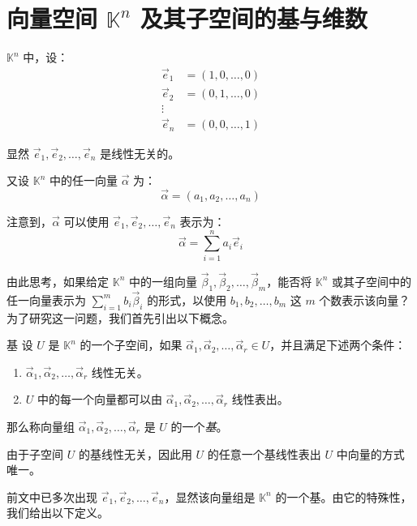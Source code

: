 
\section{向量空间 $\mathbb K^n$ 及其子空间的基与维数}

$\mathbb K^n$ 中，设：
$$
\begin{aligned}
	\vec e_1 &= (1, 0, \ldots, 0)
	\\
	\vec e_2 &= (0, 1, \ldots, 0)
	\\
	\vdots
	\\
	\vec e_n &= (0, 0, \ldots, 1)
\end{aligned}
$$

显然 $\vec e_1, \vec e_2, \ldots, \vec e_n$ 是线性无关的。

又设 $\mathbb K^n$ 中的任一向量 $\vec \alpha$ 为：
$$
\vec \alpha = (a_1, a_2, \ldots, a_n)
$$

注意到，$\vec \alpha$ 可以使用 $\vec e_1, \vec e_2, \ldots, \vec e_n$ 表示为：
$$
\vec \alpha = \sum\limits_{i = 1}^n a_i \vec e_i
$$

由此思考，如果给定 $\mathbb K^n$ 中的一组向量 $\vec \beta_1, \vec \beta_2, \ldots, \vec \beta_m$，能否将 $\mathbb K^n$ 或其子空间中的任一向量表示为 $\sum\limits_{i = 1}^m b_i \vec \beta_i$ 的形式，以使用 $b_1, b_2, \ldots, b_m$ 这 $m$ 个数表示该向量？为了研究这一问题，我们首先引出以下概念。

\begin{definition}{基}
	设 $U$ 是 $\mathbb K^n$ 的一个子空间，如果 $\vec \alpha_1, \vec \alpha_2, \ldots, \vec \alpha_r \in U$，并且满足下述两个条件：
	\begin{enumerate}
		\item $\vec \alpha_1, \vec \alpha_2, \ldots, \vec \alpha_r$ 线性无关。
		\item $U$ 中的每一个向量都可以由 $\vec \alpha_1, \vec \alpha_2, \ldots, \vec \alpha_r$ 线性表出。
	\end{enumerate}

	那么称向量组 $\vec \alpha_1, \vec \alpha_2, \ldots, \vec \alpha_r$ 是 $U$ 的一个\emph{基}。
\end{definition}

由于子空间 $U$ 的基线性无关，因此用 $U$ 的任意一个基线性表出 $U$ 中向量的方式唯一。

前文中已多次出现 $\vec e_1, \vec e_2, \ldots, \vec e_n$，显然该向量组是 $\mathbb K^n$ 的一个基。由它的特殊性，我们给出以下定义。


